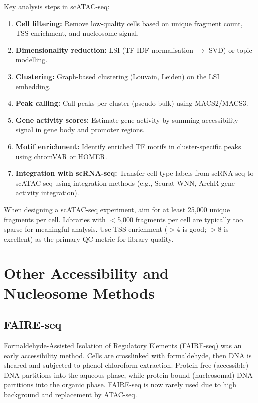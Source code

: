 Key analysis steps in scATAC-seq:
\begin{enumerate}[itemsep=2pt]
  \item \textbf{Cell filtering:} Remove low-quality cells based on unique fragment count, TSS enrichment, and nucleosome signal.
  \item \textbf{Dimensionality reduction:} LSI (TF-IDF normalisation $\rightarrow$ SVD) or topic modelling.
  \item \textbf{Clustering:} Graph-based clustering (Louvain, Leiden) on the LSI embedding.
  \item \textbf{Peak calling:} Call peaks per cluster (pseudo-bulk) using MACS2/MACS3.
  \item \textbf{Gene activity scores:} Estimate gene activity by summing accessibility signal in gene body and promoter regions.
  \item \textbf{Motif enrichment:} Identify enriched TF motifs in cluster-specific peaks using chromVAR or HOMER.
  \item \textbf{Integration with scRNA-seq:} Transfer cell-type labels from scRNA-seq to scATAC-seq using integration methods (e.g., Seurat WNN, ArchR gene activity integration).
\end{enumerate}

\begin{tipbox}
When designing a scATAC-seq experiment, aim for at least 25,000 unique fragments per cell. Libraries with $<$5,000 fragments per cell are typically too sparse for meaningful analysis. Use TSS enrichment ($>$4 is good; $>$8 is excellent) as the primary QC metric for library quality.
\end{tipbox}

\section{Other Accessibility and Nucleosome Methods}
\label{sec:chromatin:other}

\subsection{FAIRE-seq}
\label{subsec:chromatin:faire}

Formaldehyde-Assisted Isolation of Regulatory Elements (FAIRE-seq) was an early accessibility method. Cells are crosslinked with formaldehyde, then DNA is sheared and subjected to phenol-chloroform extraction. Protein-free (accessible) DNA partitions into the aqueous phase, while protein-bound (nucleosomal) DNA partitions into the organic phase. FAIRE-seq is now rarely used due to high background and replacement by ATAC-seq.


